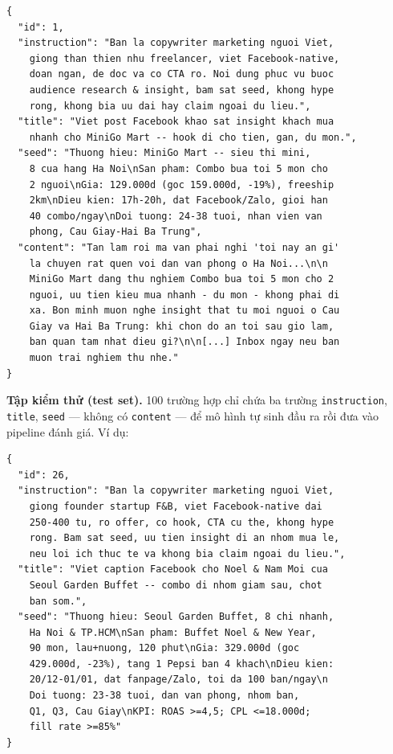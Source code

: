 \begin{lstlisting}[language={},basicstyle=\scriptsize\ttfamily,
  breaklines=true,frame=single,numbers=none,
  caption={Ví dụ mẫu trong tập huấn luyện SFT (rút gọn).}]
{
  "id": 1,
  "instruction": "Ban la copywriter marketing nguoi Viet,
    giong than thien nhu freelancer, viet Facebook-native,
    doan ngan, de doc va co CTA ro. Noi dung phuc vu buoc
    audience research & insight, bam sat seed, khong hype
    rong, khong bia uu dai hay claim ngoai du lieu.",
  "title": "Viet post Facebook khao sat insight khach mua
    nhanh cho MiniGo Mart -- hook di cho tien, gan, du mon.",
  "seed": "Thuong hieu: MiniGo Mart -- sieu thi mini,
    8 cua hang Ha Noi\nSan pham: Combo bua toi 5 mon cho
    2 nguoi\nGia: 129.000d (goc 159.000d, -19%), freeship
    2km\nDieu kien: 17h-20h, dat Facebook/Zalo, gioi han
    40 combo/ngay\nDoi tuong: 24-38 tuoi, nhan vien van
    phong, Cau Giay-Hai Ba Trung",
  "content": "Tan lam roi ma van phai nghi 'toi nay an gi'
    la chuyen rat quen voi dan van phong o Ha Noi...\n\n
    MiniGo Mart dang thu nghiem Combo bua toi 5 mon cho 2
    nguoi, uu tien kieu mua nhanh - du mon - khong phai di
    xa. Bon minh muon nghe insight that tu moi nguoi o Cau
    Giay va Hai Ba Trung: khi chon do an toi sau gio lam,
    ban quan tam nhat dieu gi?\n\n[...] Inbox ngay neu ban
    muon trai nghiem thu nhe."
}
\end{lstlisting}

\textbf{Tập kiểm thử (test set).} 100 trường hợp chỉ chứa ba trường
\texttt{instruction}, \texttt{title}, \texttt{seed} --- không có
\texttt{content} --- để mô hình tự sinh đầu ra rồi đưa vào pipeline
đánh giá. Ví dụ:

\begin{lstlisting}[language={},basicstyle=\scriptsize\ttfamily,
  breaklines=true,frame=single,numbers=none,
  caption={Ví dụ mẫu trong tập kiểm thử (không có trường content).}]
{
  "id": 26,
  "instruction": "Ban la copywriter marketing nguoi Viet,
    giong founder startup F&B, viet Facebook-native dai
    250-400 tu, ro offer, co hook, CTA cu the, khong hype
    rong. Bam sat seed, uu tien insight di an nhom mua le,
    neu loi ich thuc te va khong bia claim ngoai du lieu.",
  "title": "Viet caption Facebook cho Noel & Nam Moi cua
    Seoul Garden Buffet -- combo di nhom giam sau, chot
    ban som.",
  "seed": "Thuong hieu: Seoul Garden Buffet, 8 chi nhanh,
    Ha Noi & TP.HCM\nSan pham: Buffet Noel & New Year,
    90 mon, lau+nuong, 120 phut\nGia: 329.000d (goc
    429.000d, -23%), tang 1 Pepsi ban 4 khach\nDieu kien:
    20/12-01/01, dat fanpage/Zalo, toi da 100 ban/ngay\n
    Doi tuong: 23-38 tuoi, dan van phong, nhom ban,
    Q1, Q3, Cau Giay\nKPI: ROAS >=4,5; CPL <=18.000d;
    fill rate >=85%"
}
\end{lstlisting}

